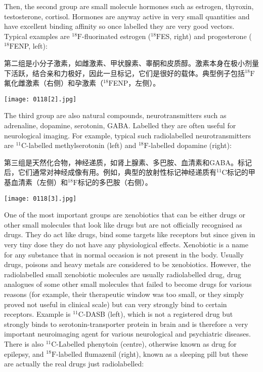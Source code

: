 \documentclass[dvipsnames, svgnames,a4paper,11pt]{article}
\begin{document}
Then, the second group are small molecule hormones such as estrogen,
thyroxin, testosterone, cortisol. Hormones are anyway active in very small quantities
and have excellent binding affinity so once labelled they are very good vectors.
Typical examples are ${}^{18}\mathrm{F}$-fluorinated estrogen (${}^{18}\mathrm{F}$ES, right) and progesterone
(${}^{18}\mathrm{F}$ENP, left):

第二组是小分子激素，如雌激素、甲状腺素、睾酮和皮质醇。激素本身在极小剂量下活跃，结合亲和力极好，因此一旦标记，它们是很好的载体。典型例子包括${}^{18}\mathrm{F}$氟化雌激素（右侧）和孕激素（${}^{18}\mathrm{F}$ENP，左侧）。

\begin{figure*}[h]
	\centering
    \texttt{[image: 0118[2].jpg]}
\end{figure*}

The third group are also natural compounds, neurotransmitters such as adrenaline,
dopamine, serotonin, GABA. Labelled they are often useful for neurological imaging.
For example, typical such radiolabelled neurotransmitters are ${}^{11}\mathrm{C}$-labelled
methylserotonin (left) and ${}^{18}\mathrm{F}$-labelled dopamine (right):

第三组是天然化合物，神经递质，如肾上腺素、多巴胺、血清素和GABA。标记后，它们通常对神经成像有用。例如，典型的放射性标记神经递质有${}^{11}\mathrm{C}$标记的甲基血清素（左侧）和${}^{18}\mathrm{F}$标记的多巴胺（右侧）。

\begin{figure*}[h]
	\centering
    \texttt{[image: 0118[3].jpg]}
\end{figure*}

One of the most important groups are xenobiotics that can be either drugs or other
small molecules that look like drugs but are not officially recognised as drugs. They
do act like drugs, bind some targets like receptors but since given in very tiny dose
they do not have any physiological effects. Xenobiotic is a name for any substance
that in normal occasion is not present in the body. Usually drugs, poisons and heavy
metals are considered to be xenobiotics. However, the radiolabelled small xenobiotic
molecules are usually radiolabelled drug, drug analogues of some other small
molecules that failed to become drugs for various reasons (for example, their
therapeutic window was too small, or they simply proved not useful in clinical scale)
but can very strongly bind to certain receptors. Example is ${}^{11}\mathrm{C}$-DASB (left), which is
not a registered drug but strongly binds to serotonin-transporter protein in brain and
is therefore a very important neuroimaging agent for various neurological and
psychiatric diseases. There is also ${}^{11}\mathrm{C}$-Labelled phenytoin (centre), otherwise known
as drug for epilepsy, and ${}^{18}\mathrm{F}$-labelled flumazenil (right), known as a sleeping pill but
these are actually the real drugs just radiolabelled:
\end{document}
